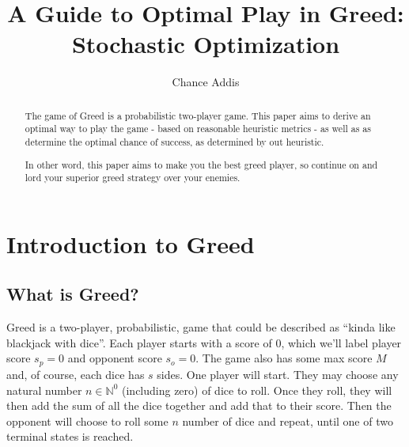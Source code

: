 \documentclass[a4paper]{article}
\title{A Guide to Optimal Play in Greed: Stochastic Optimization}
\author{Chance Addis}
\affil{Department of Mathematics and Statistics, Reed College}
\begin{document}
\maketitle

\begin{abstract}
The game of Greed is a probabilistic two-player game. This paper aims to derive an optimal way to play the game - based on reasonable heuristic metrics - as well as as determine the optimal chance of success, as determined by out heuristic. 

In other word, this paper aims to make you the best greed player, so continue on and lord your superior greed strategy over your enemies. 
\end{abstract}




\section{Introduction to Greed}


\subsection{What is Greed?}

Greed is a two-player, probabilistic, game that could be described as ``kinda like blackjack with dice''. Each player starts with a score of 0, which we'll label player score $s_p = 0$ and opponent score $s_o = 0$. The game also has some max score $M$ and, of course, each dice has $s$ sides. One player will start. They may choose any natural number $n \in \mathbb{N}^0$ (including zero) of dice to roll. Once they roll, they will then add the sum of all the dice together and add that to their score. Then the opponent will choose to roll some $n$ number of dice and repeat, until one of two terminal states is reached.
\end{document}
